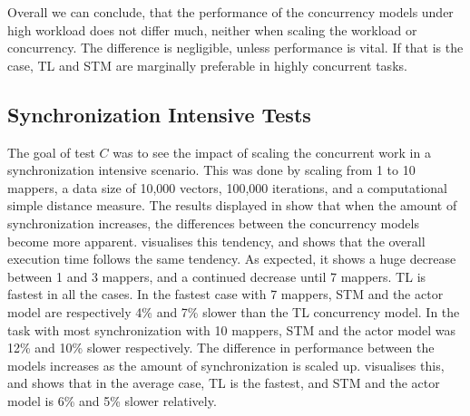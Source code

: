 %
Overall we can conclude, that the performance of the concurrency models under high workload does not differ much, neither when scaling the workload or concurrency. The difference is negligible, unless performance is vital. If that is the case, \ac{TL} and \ac{STM} are marginally preferable in highly concurrent tasks.%
%
\FloatBarrier
\subsection{Synchronization Intensive Tests}
%
The goal of test $C$ was to see the impact of scaling the concurrent work in a synchronization intensive scenario. This was done by scaling from 1 to 10 mappers, a data size of 10,000 vectors, 100,000 iterations, and a computational simple distance measure. The results displayed in  show that when the amount of synchronization increases, the differences between the concurrency models become more apparent.  visualises this tendency, and shows that the overall execution time follows the same tendency. As expected, it shows a huge decrease between 1 and 3 mappers, and a continued decrease until 7 mappers. \ac{TL} is fastest in all the cases. In the fastest case with 7 mappers, \ac{STM} and the actor model are respectively 4\% and 7\% slower than the \ac{TL} concurrency model. In the task with most synchronization with 10 mappers, \ac{STM} and the actor model was 12\% and 10\% slower respectively. The difference in performance between the models increases as the amount of synchronization is scaled up.  visualises this, and shows that in the average case, \ac{TL} is the fastest, and \ac{STM} and the actor model is 6\% and 5\% slower relatively.
%
